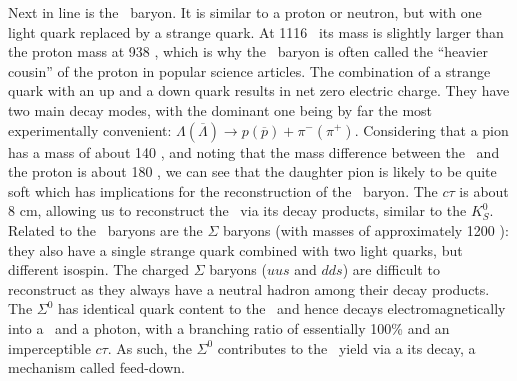       Next in line is the \Lambda\ baryon. It is similar to a proton or neutron, but with one light quark replaced by a strange quark. At 1116 \mev\ its mass is slightly larger than the proton mass at 938 \mev, which is why the \Lambda\ baryon is often called the ``heavier cousin'' of the proton in popular science articles.   The combination of a strange quark with an up and a down quark results in net zero electric charge. They have two main decay modes, with the dominant one being by far the most experimentally convenient: $\Lambda (\overline{\Lambda}) \rightarrow p (\overline{p}) + \pi^- (\pi^+)$. Considering that a pion has a mass of about 140 \mev, and noting that the mass difference between the \Lambda\ and the proton is about 180 \mev, we can see that the daughter pion is likely to be quite soft which has implications for the reconstruction of the \Lambda\ baryon. The $c\tau$ is about 8 cm, allowing us to reconstruct the \Lambda\ via its decay products, similar to the $K^0_S$. Related to the \Lambda\ baryons are the $\Sigma$ baryons (with masses of approximately 1200 \mev): they also have a single strange quark combined with two light quarks, but different isospin. The charged $\Sigma$ baryons ($uus$ and $dds$) are difficult to reconstruct as they always have a neutral hadron among their decay products. The $\Sigma^0$ has identical quark content to the \Lambda\ and hence decays electromagnetically into a \Lambda\ and a photon, with a branching ratio of essentially 100\% and an imperceptible $c\tau$. As such, the $\Sigma^0$ contributes to the \Lambda\ yield via a its decay, a mechanism called feed-down. 

